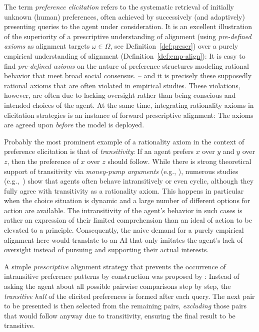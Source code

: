 \documentclass{article}
\theoremstyle{plain}
\theoremstyle{definition}
\theoremstyle{remark}
\begin{document}
 The term \textit{preference elicitation} refers to the systematic retrieval of initially unknown (human) preferences, often achieved by successively (and adaptively) presenting queries to the agent under consideration. It is an excellent illustration of the superiority of a prescriptive understanding of alignment (using \textit{pre-defined axioms} as alignment targets $\omega \in \Omega$, see Definition~\ref{def:prescr}) over a purely empirical understanding of alignment (Definition~\ref{def:emp-align}): It is easy to find \textit{pre-defined axioms} on the nature of preference structures modeling rational behavior that meet broad social consensus. %
 -- and it is precisely these supposedly rational axioms that are often violated in empirical studies. These violations, however, are often due to lacking oversight rather than being conscious and intended choices of the agent. At the same time, integrating rationality axioms in elicitation strategies is an instance of forward prescriptive alignment: The axioms are agreed upon \textit{before} the model is deployed.  

Probably the most prominent example of a rationality axiom in the context of preference elicitation is that of \textit{transitivity}: If an agent prefers $x$ over $y$ and $y$ over $z$, then the preference of $x$ over $z$ should follow. While there is strong theoretical support of transitivity via \textit{ money-pump arguments} (e.g., \citet{ALDRED01012003}), numerous studies (e.g.,~\citet{birnbaum1999evidence,Birnbaum_2016,birnbaum2008experimental,segal2021,guadelup2020}) show that agents often behave intransitively or even cyclic, although they fully agree with transitivity as a rationality axiom. This happens in particular when the choice situation is dynamic and a large number of different options for action are available. The intransitivity of the agent's behavior in such cases is rather an expression of their limited comprehension than an ideal of action to be elevated to a principle. Consequently, the naive demand for a purely empirical alignment here would translate to an AI that only imitates the agent's lack of oversight instead of pursuing and supporting their actual interests. 

A simple \textit{prescriptive} alignment strategy that prevents the occurrence of intransitive preference patterns by construction was proposed by \citet{jbas2022}: Instead of asking the agent about all possible pairwise comparisons step by step, the \textit{transitive hull} of the elicited preferences is formed after each query. The next pair to be presented is then selected from the remaining pairs, \textit{excluding} those pairs that would follow anyway due to transitivity, ensuring the final result to be transitive. 
\end{document}
